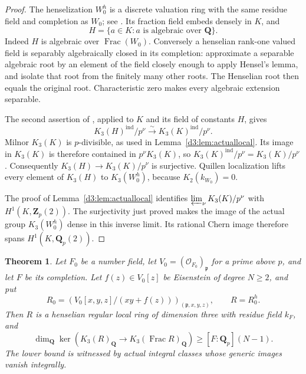 \documentclass[11pt,a4paper]{amsart}
\numberwithin{equation}{section}
\newtheorem{theorem}{Theorem}[section]
\theoremstyle{definition}
\theoremstyle{remark}
\newcommand{\Q}{\mathbf Q}
\newcommand{\Z}{\mathbf Z}
\newcommand{\OO}{\mathcal O}
\newcommand{\Frac}{\operatorname{Frac}}
\begin{document}
\begin{proof}
The henselization $W_0^h$ is a discrete valuation ring with the same
residue field and completion as $W_0$; see
\cite[Section~15.46, Lemmas~15.46.1, 15.46.3 and 15.46.11]{StacksHenselization}.
Its fraction field embeds densely in $K$, and
\[
H=\{a\in K:a\text{ is algebraic over }\Q\}.
\]
Indeed $H$ is algebraic over $\Frac(W_0)$.  Conversely a henselian
rank-one valued field is separably algebraically closed in its completion:
approximate a separable algebraic root by an element of the field closely
enough to apply Hensel's lemma, and isolate that root from the finitely
many other roots.  The Henselian root then equals the original root.
Characteristic zero makes every algebraic extension separable.

The second assertion of \cite[Theorem~4.13, p.~336]{LevineIndK3},
applied to $K$ and its field of constants $H$, gives
\[
K_3(H)^{\mathrm{ind}}/p^\nu
\xrightarrow{\sim}K_3(K)^{\mathrm{ind}}/p^\nu.
\]
Milnor $K_3(K)$ is $p$-divisible, as used in
Lemma~\ref{d3:lem:actuallocal}.  Its image in $K_3(K)$ is therefore
contained in $p^\nu K_3(K)$, so
$K_3(K)^{\mathrm{ind}}/p^\nu=K_3(K)/p^\nu$.
Consequently $K_3(H)\to K_3(K)/p^\nu$ is surjective.
Quillen localization lifts every element of $K_3(H)$ to $K_3(W_0^h)$,
because $K_2(k_{W_0})=0$.

The proof of Lemma~\ref{d3:lem:actuallocal} identifies
$\varprojlim_\nu K_3(K)/p^\nu$ with $H^1(K,\Z_p(2))$.
The surjectivity just proved makes the image of the actual group
$K_3(W_0^h)$ dense in this inverse limit.  Its rational Chern image
therefore spans $H^1(K,\Q_p(2))$.
\end{proof}

\begin{theorem}
\label{d3:thm:henselianeisensteinrank}
Let $F_0$ be a number field, let $V_0=(\OO_{F_0})_{\mathfrak p}$ for a
prime above $p$, and let $F$ be its completion.  Let $f(z)\in V_0[z]$
be Eisenstein of degree $N\geq2$, and put
\[
R_0=\left(V_0[x,y,z]/(xy+f(z))\right)_{(\mathfrak p,x,y,z)},
\qquad R=R_0^h.
\]
Then $R$ is a henselian regular local ring of dimension three with
residue field $k_F$, and
\[
\dim_{\Q}\ker\left(K_3(R)_{\Q}\longrightarrow
K_3(\Frac R)_{\Q}\right)\geq [F:\Q_p](N-1).
\]
The lower bound is witnessed by actual integral classes whose generic
images vanish integrally.
\end{theorem}
\end{document}

